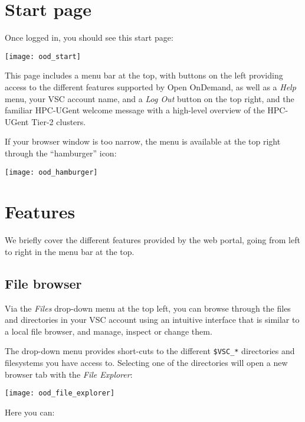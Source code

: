 \section{Start page}

Once logged in, you should see this start page:

\begin{center}
    \texttt{[image: ood\_start]}
\end{center}

This page includes a menu bar at the top, with buttons on the left providing access to the different features supported by Open OnDemand,
as well as a \emph{Help} menu, your VSC account name, and a \emph{Log Out} button on the top right,
and the familiar HPC-UGent welcome message with a high-level overview of the HPC-UGent Tier-2 clusters.

If your browser window is too narrow, the menu is available at the top right through the ``hamburger'' icon:

\begin{center}
    \texttt{[image: ood\_hamburger]}
\end{center}


\section{Features}

We briefly cover the different features provided by the web portal, going from left to right
in the menu bar at the top.

\subsection{File browser}

Via the \emph{Files} drop-down menu at the top left, you can browse through the files and directories in your
VSC account using an intuitive interface that is similar to a local file browser, and manage, inspect or change them.

The drop-down menu provides
short-cuts to the different \lstinline|$VSC_*| directories and filesystems you have access to.
Selecting one of the directories will open a new browser tab with the \emph{File Explorer}:

\begin{center}
    \texttt{[image: ood\_file\_explorer]}
\end{center}

Here you can:

